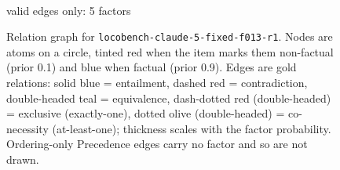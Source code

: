 \documentclass[11pt]{article}
\begin{document}
\begin{figure}[htbp]
\begin{minipage}[t]{0.48\linewidth}
{
}
\\[2pt]{\footnotesize valid edges only: 5 factors}
\end{minipage}
\caption{Relation graph for \texttt{locobench-claude-5-fixed-f013-r1}. Nodes are atoms on a circle, tinted red when the item marks them non-factual (prior 0.1) and blue when factual (prior 0.9). Edges are gold relations: solid blue = entailment, dashed red = contradiction, double-headed teal = equivalence, dash-dotted red (double-headed) = exclusive (exactly-one), dotted olive (double-headed) = co-necessity (at-least-one); thickness scales with the factor probability. Ordering-only Precedence edges carry no factor and so are not drawn.}
\label{fig:graph-locobench-claude-5-fixed-f013-r1}
\end{figure}
\end{document}

